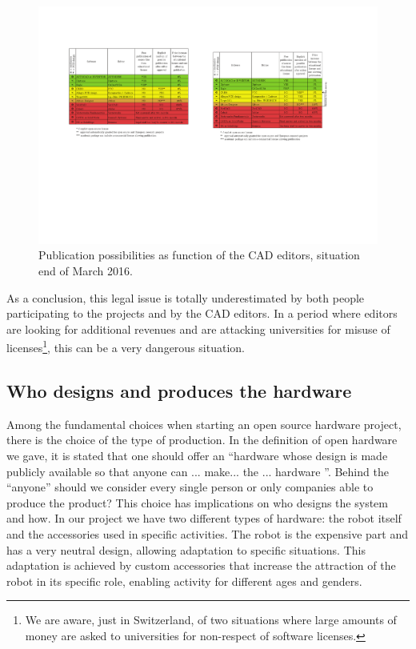 \documentclass[letterpaper, 10 pt, conference]{ieeeconf}  %
\begin{document}
\begin{figure}
\centering
\includegraphics[width=\columnwidth]{figures/table}
\caption{Publication possibilities as function of the CAD editors, situation end of March 2016.}
\label{fig:editors}
\end{figure}

As a conclusion, this legal issue is totally underestimated by both people participating to the projects and by the CAD editors. 
In a period where editors are looking for additional revenues and are attacking universities for misuse of licenses\footnote{We are aware, just in Switzerland, of two situations where large amounts of money are asked to universities for non-respect of software licenses.}, this can be a very dangerous situation.

\subsection{Who designs and produces the hardware}

Among the fundamental choices when starting an open source hardware project, there is the choice of the type of production. 
In the definition of open hardware we gave, it is stated that one should offer an ``hardware whose design is made publicly available so that anyone can ... make... the ... hardware ''.
Behind the ``anyone'' should we consider every single person or only companies able to produce the product?
This choice has implications on who designs the system and how.
In our project we have two different types of hardware: the robot itself and the accessories used in specific activities.
The robot is the expensive part and has a very neutral design, allowing adaptation to specific situations.
This adaptation is achieved by custom accessories that increase the attraction of the robot in its specific role, enabling activity for different ages and genders.
\end{document}

